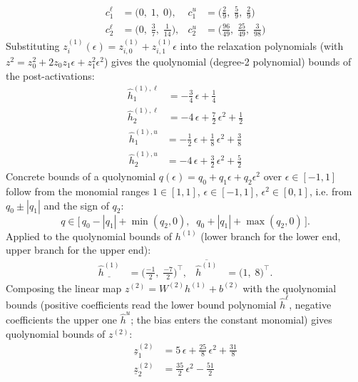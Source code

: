 \documentclass[11pt]{article}
\begin{document}
\begin{align*}
c^{\ell}_{1} &= \bigl(0,\; 1,\; 0\bigr), & c^{u}_{1} &= \bigl(\frac{2}{9},\; \frac{5}{9},\; \frac{2}{9}\bigr) \\
c^{\ell}_{2} &= \bigl(0,\; \frac{3}{7},\; \frac{1}{14}\bigr), & c^{u}_{2} &= \bigl(\frac{96}{49},\; \frac{25}{49},\; \frac{3}{98}\bigr)
\end{align*}
Substituting $z^{(1)}_i(\epsilon) = z^{(1)}_{i,0} + z^{(1)}_{i,1} \epsilon$ into the relaxation
polynomials (with $z^2 = z_0^2 + 2 z_0 z_1 \epsilon + z_1^2 \epsilon^2$) gives the quolynomial
(degree-2 polynomial) bounds of the post-activations:
\begin{align*}
\hat{h}^{(1),\ell}_{1} &= -\frac{3}{4}\,\epsilon + \frac{1}{4} \\
\hat{h}^{(1),\ell}_{2} &= -4\,\epsilon + \frac{7}{2}\,\epsilon^2 + \frac{1}{2}
\end{align*}
\begin{align*}
\hat{h}^{(1),u}_{1} &= -\frac{1}{2}\,\epsilon + \frac{1}{8}\,\epsilon^2 + \frac{3}{8} \\
\hat{h}^{(1),u}_{2} &= -4\,\epsilon + \frac{3}{2}\,\epsilon^2 + \frac{5}{2}
\end{align*}
Concrete bounds of a quolynomial $q(\epsilon) = q_0 + q_1 \epsilon + q_2 \epsilon^2$ over
$\epsilon \in [-1, 1]$ follow from the monomial ranges $1 \in [1, 1]$, $\epsilon \in [-1, 1]$,
$\epsilon^2 \in [0, 1]$, i.e. from $q_0 \pm |q_1|$ and the sign of $q_2$:
\begin{equation*}
q \in \bigl[\, q_0 - |q_1| + \min(q_2, 0), \;\; q_0 + |q_1| + \max(q_2, 0) \,\bigr].
\end{equation*}
Applied to the quolynomial bounds of $h^{(1)}$ (lower branch for the lower end, upper branch for the upper end):
\begin{align*}
\underline{\hat{h}^{(1)}} &= \bigl(\frac{-1}{2},\; \frac{-7}{2}\bigr)^{\!\top}, & \overline{\hat{h}^{(1)}} &= \bigl(1,\; 8\bigr)^{\!\top}.
\end{align*}
Composing the linear map $z^{(2)} = W^{(2)} h^{(1)} + b^{(2)}$ with the quolynomial bounds
(positive coefficients read the lower bound polynomial $\hat{h}^{\ell}$, negative coefficients the
upper one $\hat{h}^{u}$; the bias enters the constant monomial) gives quolynomial bounds of
$z^{(2)}$:
\begin{align*}
\underline{z}^{(2)}_{1} &= 5\,\epsilon + \frac{25}{8}\,\epsilon^2 + \frac{31}{8} \\
\underline{z}^{(2)}_{2} &= \frac{35}{2}\,\epsilon^2 - \frac{51}{2}
\end{align*}
\end{document}
